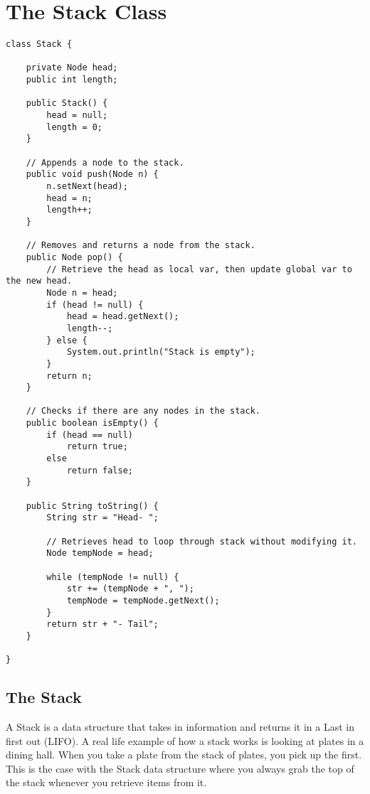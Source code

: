 \documentclass[letterpaper, 10pt,DIV=13]{scrartcl}
\numberwithin{equation}{section} %
\numberwithin{figure}{section} %
\numberwithin{table}{section} %
\begin{document}
\section{The Stack Class}

\lstset{numbers=left, numberstyle=\tiny, stepnumber=1, numbersep=5pt, basicstyle=\footnotesize\ttfamily}
\begin{lstlisting}[frame=single, ]
class Stack {

    private Node head;
    public int length;

    public Stack() {
        head = null;
        length = 0;
    }

    // Appends a node to the stack.
    public void push(Node n) {
        n.setNext(head);
        head = n;
        length++;
    }

    // Removes and returns a node from the stack.
    public Node pop() {
        // Retrieve the head as local var, then update global var to the new head.
        Node n = head;
        if (head != null) {
            head = head.getNext();
            length--;
        } else {
            System.out.println("Stack is empty");
        }
        return n;
    }

    // Checks if there are any nodes in the stack.
    public boolean isEmpty() {
        if (head == null)
            return true;
        else
            return false;
    }

    public String toString() {
        String str = "Head- ";

        // Retrieves head to loop through stack without modifying it.
        Node tempNode = head;

        while (tempNode != null) {
            str += (tempNode + ", ");
            tempNode = tempNode.getNext();
        }
        return str + "- Tail";
    }

}
\end{lstlisting}

\subsection{The Stack}
A Stack is a data structure that takes in information and returns it in a Last in first out (LIFO). A real life example of how a stack works is looking at plates in a dining hall. When you take a plate from the stack of plates, you pick up the first. This is the case with the Stack data structure where you always grab the top of the stack whenever you retrieve items from it. 
\end{document}
